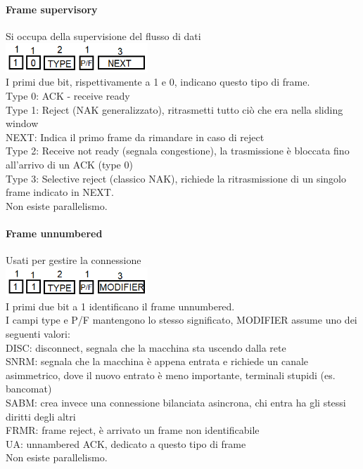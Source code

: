 \documentclass[10pt,a4paper,twoside]{article}
\begin{document}
\paragraph{Frame supervisory} Si occupa della supervisione del flusso di dati\\
\includegraphics[width=0.4\textwidth]{images/hdlc_supervisory.png}\\
I primi due bit, rispettivamente a 1 e 0, indicano questo tipo di frame.\\
Type 0: ACK - receive ready\\
Type 1: Reject (NAK generalizzato), ritrasmetti tutto ciò che era nella sliding window\\
NEXT: Indica il primo frame da rimandare in caso di reject\\
Type 2: Receive not ready (segnala congestione), la trasmissione è bloccata fino all'arrivo di un ACK (type 0)\\
Type 3: Selective reject (classico NAK), richiede la ritrasmissione di un singolo frame indicato in NEXT.\\
Non esiste parallelismo.

\paragraph{Frame unnumbered} Usati per gestire la connessione\\
\includegraphics[width=0.4\textwidth]{images/hdlc_unnumbered.png}\\
I primi due bit a 1 identificano il frame unnumbered.\\
I campi type e P/F mantengono lo stesso significato, MODIFIER assume uno dei seguenti valori:\\
DISC: disconnect, segnala che la macchina sta uscendo dalla rete\\
SNRM: segnala che la macchina è appena entrata e richiede un canale asimmetrico, dove il nuovo entrato è meno importante, terminali stupidi (es. bancomat)\\
SABM: crea invece una connessione bilanciata asincrona, chi entra ha gli stessi diritti degli altri\\
FRMR: frame reject, è arrivato un frame non identificabile\\
UA: unnambered ACK, dedicato a questo tipo di frame\\
Non esiste parallelismo.
\end{document}
